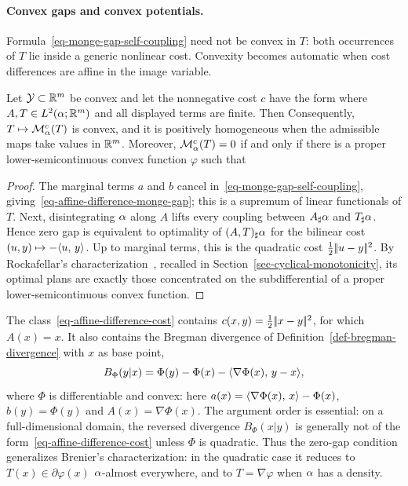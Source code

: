 \paragraph{Convex gaps and convex potentials.}

Formula~\eqref{eq-monge-gap-self-coupling} need not be convex in $T$: both occurrences of $T$ lie inside a generic nonlinear cost. Convexity becomes automatic when cost differences are affine in the image variable.

\begin{prop}\label{prop-affine-difference-monge-gap}
	Let $\mathcal{Y}\subset\mathbb{R}^m$ be convex and let the nonnegative cost $c$ have the form
	where $A,T\in L^2(\alpha;\mathbb{R}^m)$ and all displayed terms are finite. Then
	Consequently, $T\mapsto\mathcal M_\alpha^c(T)$ is convex, and it is positively homogeneous when the admissible maps take values in $\mathbb{R}^m$. Moreover, $\mathcal M_\alpha^c(T)=0$ if and only if there is a proper lower-semicontinuous convex function $\varphi$ such that
\end{prop}
\begin{proof}
	The marginal terms $a$ and $b$ cancel in~\eqref{eq-monge-gap-self-coupling}, giving~\eqref{eq-affine-difference-monge-gap}; this is a supremum of linear functionals of $T$. Next, disintegrating $\alpha$ along $A$ lifts every coupling between $A_\sharp\alpha$ and $T_\sharp\alpha$. Hence zero gap is equivalent to optimality of $(A,T)_\sharp\alpha$ for the bilinear cost $(u,y)\mapsto-\langle u,\,y\rangle$. Up to marginal terms, this is the quadratic cost $\frac12|\!| u-y |\!|^2$. By Rockafellar's characterization~\cite{rockafellar2015convex}, recalled in Section~\ref{sec-cyclical-monotonicity}, its optimal plans are exactly those concentrated on the subdifferential of a proper lower-semicontinuous convex function.
\end{proof}

The class~\eqref{eq-affine-difference-cost} contains $c(x,y)=\frac12|\!| x-y |\!|^2$, for which $A(x)=x$. It also contains the Bregman divergence of Definition~\ref{def-bregman-divergence} with $x$ as base point,
\[
	B_\Phi(y|x)=\Phi(y)-\Phi(x)-\langle \nabla\Phi(x),\,y-x\rangle,
\]
where $\Phi$ is differentiable and convex: here $a(x)=\langle \nabla\Phi(x),\,x\rangle-\Phi(x)$, $b(y)=\Phi(y)$ and $A(x)=\nabla\Phi(x)$. The argument order is essential: on a full-dimensional domain, the reversed divergence $B_\Phi(x|y)$ is generally not of the form~\eqref{eq-affine-difference-cost} unless $\Phi$ is quadratic. Thus the zero-gap condition generalizes Brenier's characterization: in the quadratic case it reduces to $T(x)\in\partial\varphi(x)$ $\alpha$-almost everywhere, and to $T=\nabla\varphi$ when $\alpha$ has a density.

